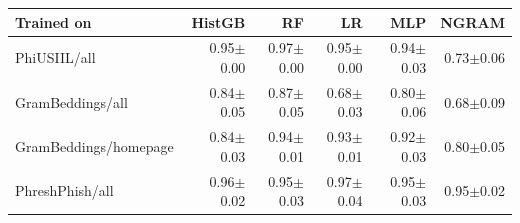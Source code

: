 {\footnotesize
\begin{tabular}{lrrrrr}
\toprule
\textbf{Trained on} & \textbf{HistGB} & \textbf{RF} & \textbf{LR} & \textbf{MLP} & \textbf{NGRAM} \\
\midrule
PhiUSIIL/all & 0.95$\pm$0.00 & 0.97$\pm$0.00 & 0.95$\pm$0.00 & 0.94$\pm$0.03 & 0.73$\pm$0.06 \\
GramBeddings/all & 0.84$\pm$0.05 & 0.87$\pm$0.05 & 0.68$\pm$0.03 & 0.80$\pm$0.06 & 0.68$\pm$0.09 \\
GramBeddings/homepage & 0.84$\pm$0.03 & 0.94$\pm$0.01 & 0.93$\pm$0.01 & 0.92$\pm$0.03 & 0.80$\pm$0.05 \\
PhreshPhish/all & 0.96$\pm$0.02 & 0.95$\pm$0.03 & 0.97$\pm$0.04 & 0.95$\pm$0.03 & 0.95$\pm$0.02 \\
\bottomrule
\end{tabular}
}
